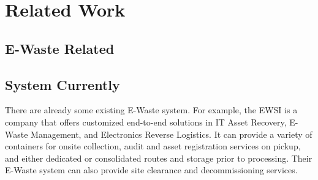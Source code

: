 \section{Related Work}

\subsection{E-Waste Related}

 

 











\subsection{System Currently}
There are already some existing E-Waste system. For example, the EWSI is a company that offers customized end-to-end solutions in IT Asset Recovery, E-Waste Management, and Electronics Reverse Logistics. It can provide a variety of containers for onsite collection, audit and asset registration services on pickup, and either dedicated or consolidated routes and storage prior to processing. Their E-Waste system can also provide site clearance and decommissioning services.

